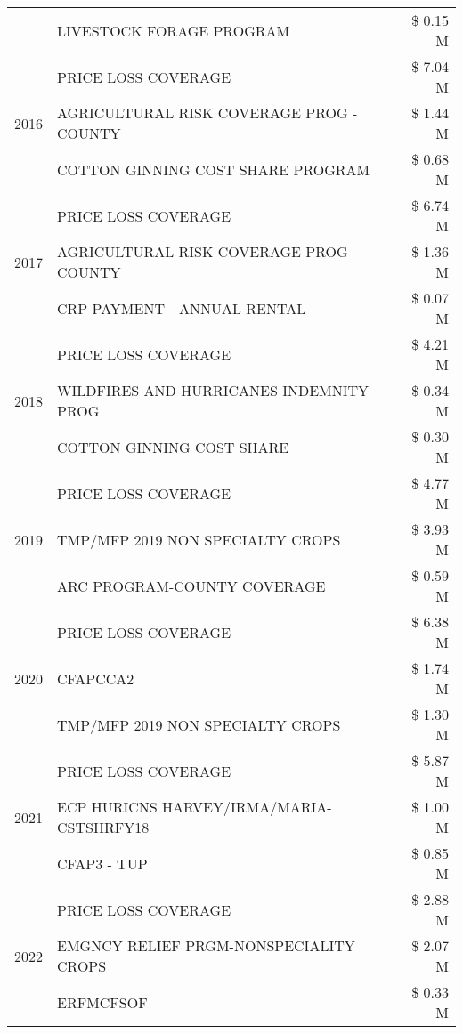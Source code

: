 \begin{tabular}{llr}
 & LIVESTOCK FORAGE PROGRAM & \$ 0.15 M \\
\cline{1-3}
\multirow[t]{3}{*}{2016} & PRICE LOSS COVERAGE & \$ 7.04 M \\
 & AGRICULTURAL RISK COVERAGE PROG - COUNTY & \$ 1.44 M \\
 & COTTON GINNING COST SHARE PROGRAM & \$ 0.68 M \\
\cline{1-3}
\multirow[t]{3}{*}{2017} & PRICE LOSS COVERAGE & \$ 6.74 M \\
 & AGRICULTURAL RISK COVERAGE PROG - COUNTY & \$ 1.36 M \\
 & CRP PAYMENT - ANNUAL RENTAL & \$ 0.07 M \\
\cline{1-3}
\multirow[t]{3}{*}{2018} & PRICE LOSS COVERAGE & \$ 4.21 M \\
 & WILDFIRES AND HURRICANES INDEMNITY PROG & \$ 0.34 M \\
 & COTTON GINNING COST SHARE & \$ 0.30 M \\
\cline{1-3}
\multirow[t]{3}{*}{2019} & PRICE LOSS COVERAGE & \$ 4.77 M \\
 & TMP/MFP 2019 NON SPECIALTY CROPS & \$ 3.93 M \\
 & ARC PROGRAM-COUNTY COVERAGE & \$ 0.59 M \\
\cline{1-3}
\multirow[t]{3}{*}{2020} & PRICE LOSS COVERAGE & \$ 6.38 M \\
 & CFAPCCA2 & \$ 1.74 M \\
 & TMP/MFP 2019 NON SPECIALTY CROPS & \$ 1.30 M \\
\cline{1-3}
\multirow[t]{3}{*}{2021} & PRICE LOSS COVERAGE & \$ 5.87 M \\
 & ECP HURICNS HARVEY/IRMA/MARIA-CSTSHRFY18 & \$ 1.00 M \\
 & CFAP3 - TUP & \$ 0.85 M \\
\cline{1-3}
\multirow[t]{3}{*}{2022} & PRICE LOSS COVERAGE & \$ 2.88 M \\
 & EMGNCY RELIEF PRGM-NONSPECIALITY CROPS & \$ 2.07 M \\
 & ERFMCFSOF & \$ 0.33 M \\
\cline{1-3}
\bottomrule
\end{tabular}

